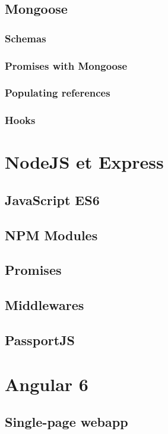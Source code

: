 \documentclass[11pt,a4paper]{report}
\begin{document}
\section{Mongoose}

\subsection{Schemas}
\subsection{Promises with Mongoose}
\subsection{Populating references}
\subsection{Hooks}
\chapter{NodeJS et Express}
\section{JavaScript ES6}
\section{NPM Modules}
\section{Promises}
\section{Middlewares}
\section{PassportJS}

\chapter{Angular 6}
\section{Single-page webapp}
\end{document}
